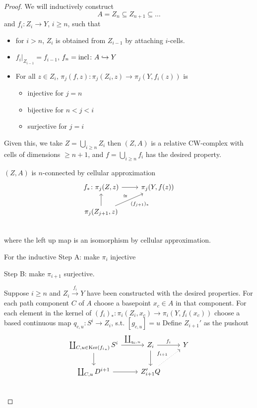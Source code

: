 \documentclass[language=english]{TemplateLecture}
\begin{document}
\begin{proof}
    We will inductively construct
    \[A = Z_n \subseteq Z_{n+1}\subseteq \dots\]
    and \(f_i\colon Z_i\to Y\), \(i\geq n\), such that
    \begin{itemize}
        \item for \(i >n\), \(Z_i\) is obtained from \(Z_{i-1}\) by attaching \(i\)-cells.
        \item \(f_i\rvert_{Z_{i-1}} = f_{i-1}\), \(f_n = \operatorname{incl}\colon A\hookrightarrow Y\)
        \item For all \(z\in Z_i\), \(\pi_j(f,z)\colon \pi_j(Z_i, z)\to \pi_j(Y, f_i(z))\) is
        \begin{itemize}
            \item injective for \(j = n\)
            \item bijective for \(n <j<i\)
            \item surjective for \(j = i\)
        \end{itemize}
    \end{itemize}
    Given this, we take \(Z = \bigcup_{i\geq n} Z_i\) then \((Z,A)\) is a relative CW-complex with cells of dimensions \(\geq n+1\), and \(f = \bigcup_{i\geq n} f_i\) has the desired property.

    \((Z,A)\) is \(n\)-connected by cellular approximation
    \[\begin{tikzcd}
        f_*\colon \pi_j(Z,z) \ar[r]& \pi_j(Y, f(z)) \\
        \pi_j(Z_{j+1},z) \ar[u]\ar[ru, "\cong", "(f_{j+1})_*"'] & \\
    \end{tikzcd}\]
    where the left up map is an isomorphism by cellular approximation.

    For the inductive Step A: make \(\pi_i\) injective

    Step B: make \(\pi_{i+1}\) surjective.

    Suppose \(i\geq n\) and \(Z_i\xrightarrow{f_i}Y\) have been constructed with the desired properties. For each path component \(C\) of \(A\) choose a basepoint \(x_c\in A\) in that component. For each element in the kernel of \((f_i)_*\colon \pi_i(Z_i, x_c)\to \pi_i(Y, f_i(x_c))\) choose a based continuous map  \(q_{c,u}\colon S^i \to Z_i\), s.t. \([g_{c,u}] = u\) Define \(Z_{i+1}'\) as the pushout
    \[\begin{tikzcd}
        \coprod_{C, u\in \Ker({f_i}_*)} S^i \ar[r, "\coprod_{q_c,u}"] \ar[d] & Z_i \ar[r, "f_i"]\ar[d] & Y \\
        \coprod_{C,u} D^{i+1} \ar[r] & Z_{i+1}' \ar[ru, dotted, "f_{i+1}"] Q \\
    \end{tikzcd}\]


\end{proof}
\end{document}
